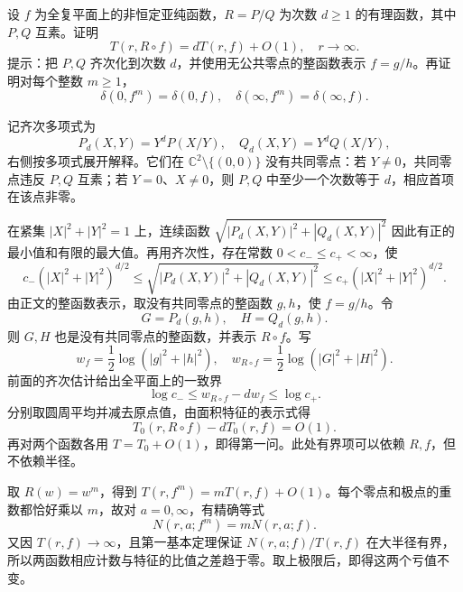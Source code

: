 \begin{exercise}\label{b3:ex:C-6}
设 \(f\) 为全复平面上的非恒定亚纯函数，\(R=P/Q\) 为次数 \(d\ge1\) 的有理函数，其中 \(P,Q\) 互素。证明
\[
 T(r,R\circ f)=dT(r,f)+O(1),\quad r\to\infty.
\]
提示：把 \(P,Q\) 齐次化到次数 \(d\)，并使用无公共零点的整函数表示 \(f=g/h\)。再证明对每个整数 \(m\ge1\)，
\[
 \delta(0,f^m)=\delta(0,f),
 \quad\delta(\infty,f^m)=\delta(\infty,f).
\]
\end{exercise}
\begin{solution}
记齐次多项式为
\[
 P_d(X,Y)=Y^dP(X/Y),
 \quad Q_d(X,Y)=Y^dQ(X/Y),
\]
右侧按多项式展开解释。它们在 \(\mathbb C^2\setminus\{(0,0)\}\) 没有共同零点：若 \(Y\ne0\)，共同零点违反 \(P,Q\) 互素；若 \(Y=0\)、\(X\ne0\)，则 \(P,Q\) 中至少一个次数等于 \(d\)，相应首项在该点非零。

在紧集 \(|X|^2+|Y|^2=1\) 上，连续函数
\(\sqrt{|P_d(X,Y)|^2+|Q_d(X,Y)|^2}\)
因此有正的最小值和有限的最大值。再用齐次性，存在常数 \(0<c_-\le c_+<\infty\)，使
\[
 c_-(|X|^2+|Y|^2)^{d/2}
 \le\sqrt{|P_d(X,Y)|^2+|Q_d(X,Y)|^2}
 \le c_+(|X|^2+|Y|^2)^{d/2}.
\]
由正文的整函数表示，取没有共同零点的整函数 \(g,h\)，使 \(f=g/h\)。令
\[
 G=P_d(g,h),\quad H=Q_d(g,h).
\]
则 \(G,H\) 也是没有共同零点的整函数，并表示 \(R\circ f\)。写
\[
 w_f=\frac12\log(|g|^2+|h|^2),
 \quad w_{R\circ f}=\frac12\log(|G|^2+|H|^2).
\]
前面的齐次估计给出全平面上的一致界
\[
 \log c_-\le w_{R\circ f}-dw_f\le\log c_+.
\]
分别取圆周平均并减去原点值，由面积特征的表示式得
\[
 T_0(r,R\circ f)-dT_0(r,f)=O(1).
\]
再对两个函数各用 \(T=T_0+O(1)\)，即得第一问。此处有界项可以依赖 \(R,f\)，但不依赖半径。

取 \(R(w)=w^m\)，得到 \(T(r,f^m)=mT(r,f)+O(1)\)。每个零点和极点的重数都恰好乘以 \(m\)，故对 \(a=0,\infty\)，有精确等式
\[
 N(r,a;f^m)=mN(r,a;f).
\]
又因 \(T(r,f)\to\infty\)，且第一基本定理保证 \(N(r,a;f)/T(r,f)\) 在大半径有界，所以两函数相应计数与特征的比值之差趋于零。取上极限后，即得这两个亏值不变。
\end{solution}

